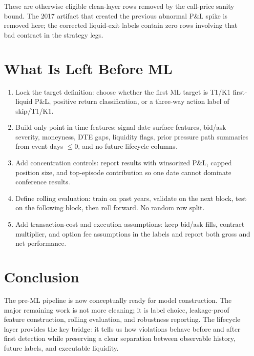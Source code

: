 \documentclass[11pt]{article}
\begin{document}
These are otherwise eligible clean-layer rows removed by the call-price sanity bound. The 2017
artifact that created the previous abnormal P\&L spike is removed here; the corrected liquid-exit
labels contain zero rows involving that bad contract in the strategy legs.

\section{What Is Left Before ML}

\begin{enumerate}
\item Lock the target definition: choose whether the first ML target is T1/K1 first-liquid P\&L,
positive return classification, or a three-way action label of skip/T1/K1.
\item Build only point-in-time features: signal-date surface features, bid/ask severity,
moneyness, DTE gaps, liquidity flags, prior pressure path summaries from event days \(\le 0\),
and no future lifecycle columns.
\item Add concentration controls: report results with winsorized P\&L, capped position size, and
top-episode contribution so one date cannot dominate conference results.
\item Define rolling evaluation: train on past years, validate on the next block, test on the
following block, then roll forward. No random row split.
\item Add transaction-cost and execution assumptions: keep bid/ask fills, contract multiplier,
and option fee assumptions in the labels and report both gross and net performance.
\end{enumerate}

\section{Conclusion}

The pre-ML pipeline is now conceptually ready for model construction. The major remaining work is
not more cleaning; it is label choice, leakage-proof feature construction, rolling evaluation, and
robustness reporting. The lifecycle layer provides the key bridge: it tells us how violations
behave before and after first detection while preserving a clear separation between observable
history, future labels, and executable liquidity.
\end{document}

